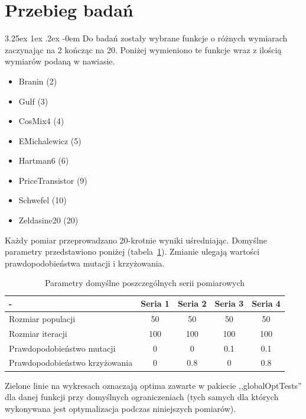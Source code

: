 \documentclass[11pt, a4paper]{article}
\makeatletter
\newcommand{\fbi}{\leavevmode{\parindent=1em\indent}}
\renewcommand\paragraph{\@startsection{paragraph}{5}{\z@}
  {3.25ex \@plus1ex \@minus.2ex}
  {-0em}
  {\normalfont\normalsize\bfseries}}
\makeatother
\begin{document}
\newpage
\section{Przebieg badań}
\paragraph{}
Do badań zostały wybrane funkcje o różnych wymiarach zaczynając na 2 kończąc na 20. Poniżej wymieniono te funkcje wraz z ilością wymiarów podaną w nawiasie.

\begin{itemize}
	\item Branin (2)
	\item Gulf (3)
	\item CosMix4 (4)
	\item EMichalewicz (5)
	\item Hartman6 (6)
	\item PriceTransistor (9)
	\item Schwefel (10)
	\item Zeldasine20 (20)
\end{itemize}

\fbi
Każdy pomiar przeprowadzano 20-krotnie wyniki uśredniając. Domyślne parametry przedstawiono poniżej (tabela~\ref{tab:parametry}). Zmianie ulegają wartości  prawdopodobieństwa mutacji i krzyżowania.

\begin{table}[htbp]
	\centering
	\caption{Parametry domyślne poszczególnych serii pomiarowych}
	\label{tab:parametry}
	\begin{tabularx}{\textwidth}{|X|c|c|c|c|}
		\hline
		- & Seria 1 & Seria 2 & Seria 3 & Seria 4\\ 
		\hline
		Rozmiar populacji & 50 & 50 & 50 & 50 \\ 
		\hline 
		Rozmiar iteracji & 100 & 100 & 100 & 100 \\ 
		\hline 
		Prawdopodobieństwo mutacji & 0 & 0 & 0.1 & 0.1 \\ 
		\hline 
		Prawdopodobieństwo krzyżowania & 0 & 0.8 & 0 & 0.8 \\ 
		\hline 
	\end{tabularx} 
\end{table}

\fbi
Zielone linie na wykresach oznaczają optima zawarte w pakiecie ,,globalOptTests'' dla danej funkcji przy domyślnych ograniczeniach (tych samych dla których wykonywana jest optymalizacja podczas niniejszych pomiarów).
\end{document}

